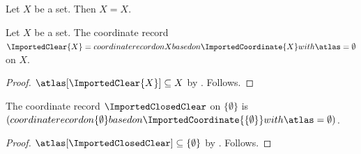 

\begin{proposition}\label{imported_anchor}
    Let $X$ be a set.
    Then $X=X$.
\end{proposition}

\begin{construction}\label{imported_clear}
    Let $X$ be a set.
    The coordinate record $\ImportedClear{X}=
        coordinate record on X based on \ImportedCoordinate{X}
            with \atlas=\emptyset$ on $X$.
\end{construction}
\begin{proof}
    $\atlas[\ImportedClear{X}]\subseteq X$
        by .
    Follows.
\end{proof}

\begin{instance}\label{imported_closed_clear}
    The coordinate record $\ImportedClosedClear$ on $\{\emptyset\}$ is
        $(coordinate record on \{\emptyset\} based on
            \ImportedCoordinate{\{\emptyset\}} with \atlas=\emptyset)$.
\end{instance}
\begin{proof}
    $\atlas[\ImportedClosedClear]\subseteq\{\emptyset\}$
        by .
    Follows.
\end{proof}
